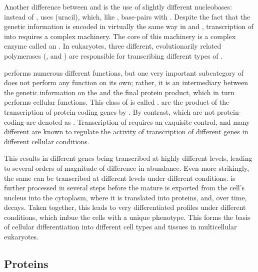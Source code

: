 Another difference between \dna and \rna is the use of slightly different
nucleobases: instead of \nT, \rna uses \nU (uracil), which, like \nT, base-pairs
with \nA. Despite the fact that the genetic information is encoded in virtually
the same way in \dna and \rna, transcription of \dna into \rna requires a
complex machinery. The core of this machinery is a complex enzyme called an
. In eukaryotes, three different, evolutionarily related
\rna polymerases (,  and ) are responsible for transcribing
different types of \rna.

\rna performs numerous different functions, but one very important subcategory
of \rna does not perform any function on its own; rather, it is an intermediary
between the genetic information on the \dna and the final protein product, which
in turn performs cellular functions. This class of \rna is called \mrna.
\mrna[s] are the product of the transcription of protein-coding genes by .
By contrast, \rna[s] which are not protein-coding are denoted as \ncrna.
Transcription of \mrna requires an exquisite control, and many different \tf[s]
are known to regulate the activity of transcription of different genes in
different cellular conditions.

This results in different \mrna genes being transcribed at highly different
levels, leading to several orders of magnitude of difference in \mrna abundance.
Even more strikingly, the same \mrna can be transcribed at different levels
under different conditions. \mrna is further processed in several steps before
the mature \mrna is exported from the cell’s nucleus into the cytoplasm, where
it is translated into proteins, and, over time, decays. Taken together, this
leads to very differentiated \mrna profiles under different conditions, which
imbue the cells with a unique phenotype. This forms the basis of cellular
differentiation into different cell types and tissues in multicellular
eukaryotes.

\subsection{Proteins}

